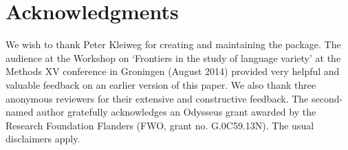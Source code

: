 \documentclass[output=paper]{LSP/langsci}
\begin{document}
\section*{Acknowledgments}

We wish to thank Peter Kleiweg for creating and maintaining the  package. The audience at the Workshop on `Frontiers in the study of language variety' at the Methods XV conference in Groningen (August 2014) provided very helpful and valuable feedback on an earlier version of this paper. We also thank three anonymous reviewers for their extensive and constructive feedback. The second-named author gratefully acknowledges an Odysseus grant awarded by the Research Foundation Flanders (FWO, grant no. G.0C59.13N). The usual disclaimers apply.


%

\printbibliography[heading=subbibliography,notkeyword=this]
\end{document}
